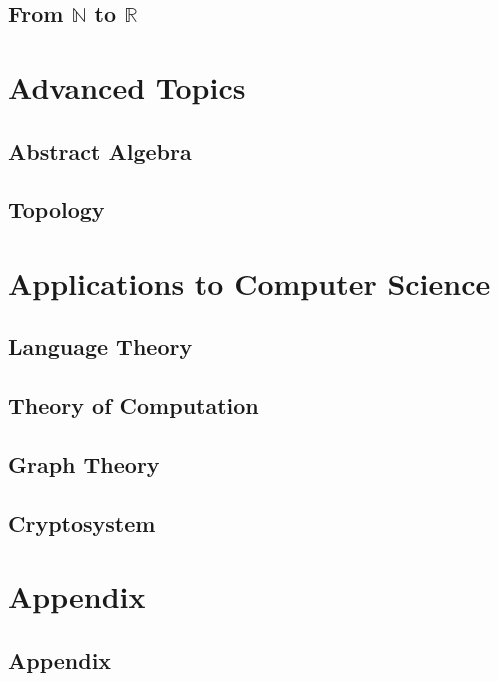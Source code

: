 \documentclass{report}
\theoremstyle{break}
\begin{document}
		\chapter{From $\mathbb{N}$ to $\mathbb{R}$}
		    
	
	\part{Advanced Topics}
	    
	    \chapter{Abstract Algebra}
	        
	    
	    \chapter{Topology}
	        

	\part{Applications to Computer Science}
	
		\chapter{Language Theory}
		    
		
		\chapter{Theory of Computation}
		    
		
		\chapter{Graph Theory}
		    
		
		\chapter{Cryptosystem}
		    
	
	\part{Appendix}
		\chapter{Appendix}
		    
\end{document}
